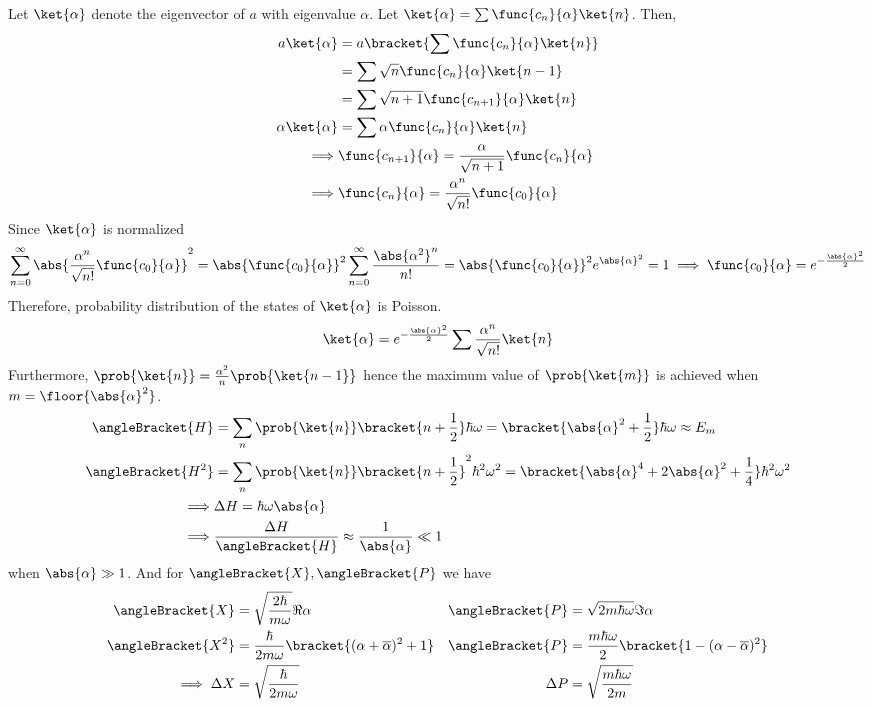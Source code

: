 Let \(\ket{\alpha}\) denote the eigenvector of \(a\) with eigenvalue \(\alpha\). Let \(\ket{\alpha} = \sum \func{c_n}{\alpha} \ket{n}\). Then, 
\begin{align*}
    a \ket{\alpha} &= a \bracket{\sum \func{c_n}{\alpha} \ket{n}} \\
    &= \sum \sqrt{n}\func{c_n}{\alpha}\ket{n - 1}\\
    &= \sum \sqrt{n + 1}\func{c_{n+1}}{\alpha}\ket{n}\\
    \alpha \ket{\alpha}&= \sum \alpha\func{c_{n}}{\alpha}\ket{n}\\
    \implies & \func{c_{n+1}}{\alpha} = \dfrac{\alpha}{\sqrt{n+1}} \func{c_n}{\alpha} \\
    \implies & \func{c_n}{\alpha} = \dfrac{\alpha^{n}}{\sqrt{n!}} \func{c_0}{\alpha}
\end{align*}
Since \(\ket{\alpha}\) is normalized
\begin{equation*}
    \sum_{n = 0}^{\infty} \abs{\dfrac{\alpha^{n}}{\sqrt{n!}} \func{c_0}{\alpha}}^2 = \abs{\func{c_0}{\alpha}}^2 \sum_{n= 0}^{\infty} \dfrac{\abs{\alpha^2}^n}{n!} = \abs{\func{c_0}{\alpha}}^2 e^{\abs{\alpha}^2} = 1 \implies \func{c_0}{\alpha} = e^{- \frac{\abs{\alpha}^2}{2}}
\end{equation*}
Therefore, probability distribution of the states of \(\ket{\alpha}\) is Poisson.
\begin{equation*}
    \ket{\alpha} = e^{- \frac{\abs{\alpha}^2}{2}} \sum \frac{\alpha^n}{\sqrt{n!}} \ket{n}
\end{equation*}
Furthermore, \(\prob{\ket{n}} = \frac{\alpha^2}{n} \prob{\ket{n-1}}\) hence the maximum value of \(\prob{\ket{m}}\) is achieved when \(m = \floor{\abs{\alpha}^2}\). 
\begin{align*}
    \angleBracket{H} &= \sum_n \prob{\ket{n}} \bracket{n + \frac{1}{2}}\hbar \omega = \bracket{\abs{\alpha}^2 + \frac{1}{2}}\hbar \omega \approx E_m\\
    \angleBracket{H^2} &= \sum_n \prob{\ket{n}} \bracket{n + \frac{1}{2}}^2\hbar^2 \omega^2 = \bracket{\abs{\alpha}^4 +2 \abs{\alpha}^2 + \frac{1}{4}}\hbar^2 \omega^2 \\
    \implies& \Delta H = \hbar \omega \abs{\alpha}\\
    \implies& \dfrac{\Delta H}{\angleBracket{H}} \approx \frac{1}{\abs{\alpha}} \ll 1
\end{align*}
when \(\abs{\alpha} \gg 1\). And for \(\angleBracket{X}, \angleBracket{P}\) we have 
\begin{align*}
    \angleBracket{X}&= \sqrt{\dfrac{2\hbar}{m \omega}} \Re{\alpha} & \angleBracket{P} &= \sqrt{2m \hbar \omega} \Im \alpha \\
    \angleBracket{X^2}&= \dfrac{\hbar}{2m \omega} \bracket{(\alpha + \overline{\alpha})^2 + 1} & \angleBracket{P} &= \frac{m \hbar \omega}{2} \bracket{1- (\alpha - \overline{\alpha})^2}  \\
    \implies \Delta X  &= \sqrt{\dfrac{\hbar}{2 m \omega}} & \Delta P &= \sqrt{\dfrac{m\hbar \omega}{2 m }} 
\end{align*}
